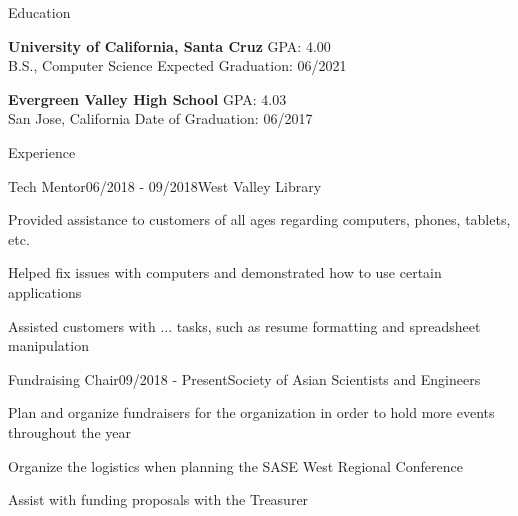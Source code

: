 \documentclass{resume}
\begin{document}
\begin{rSection}{Education}

{\bf University of California, Santa Cruz} \hfill {GPA: 4.00} 
\\ B.S., Computer Science \hfill {Expected Graduation: 06/2021}

\item {\bf Evergreen Valley High School} \hfill { GPA: 4.03} 
\\ San Jose, California \hfill {Date of Graduation: 06/2017}

\end{rSection}


\begin{rSection}{Experience}

\begin{rSubsection}{Tech Mentor}{06/2018 - 09/2018}{West Valley Library}{}
\item Provided assistance to customers of all ages regarding computers, phones, tablets, etc.
\item Helped fix issues with computers and demonstrated how to use certain applications
\item Assisted customers with ... tasks, such as resume formatting and spreadsheet manipulation
\end{rSubsection}

\begin{rSubsection}{Fundraising Chair}{09/2018 - Present}{Society of Asian Scientists and Engineers}{}
\item Plan and organize fundraisers for the organization in order to hold more events throughout the year
\item Organize the logistics when planning the SASE West Regional Conference
\item Assist with funding proposals with the Treasurer
\end{rSubsection}

\end{rSection}
\end{document}
